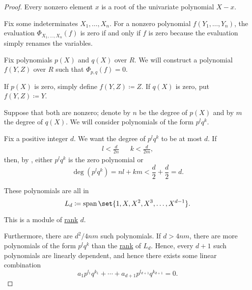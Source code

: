 \begin{proof}
   Every nonzero element \( x \) is a root of the univariate polynomial \( X - x \).

   Fix some indeterminates \( X_1, \ldots, X_n \). For a nonzero polynomial \( f(Y_1, \ldots, Y_n) \), the evaluation \( \Phi_{X_1, \dots, X_n}(f) \) is zero if and only if \( f \) is zero because the evaluation simply renames the variables.

   Fix polynomials \( p(X) \) and \( q(X) \) over \( R \). We will construct a polynomial \( f(Y, Z) \) over \( R \) such that \( \Phi_{p,q}(f) = 0 \).

  If \( p(X) \) is zero, simply define \( f(Y, Z) \coloneqq Z \). If \( q(X) \) is zero, put \( f(Y, Z) \coloneqq Y \).

  Suppose that both are nonzero; denote by \( n \) be the degree of \( p(X) \) and by \( m \) the degree of \( q(X) \). We will consider polynomials of the form \( p^l q^k \).

  Fix a positive integer \( d \). We want the degree of \( p^l q^k \) to be at most \( d \). If
  \begin{align*}
    l < \frac d {2n} && k < \frac d {2m},
  \end{align*}
  then, by , either \( p^l q^k \) is the zero polynomial or
  \begin{equation*}
    \deg(p^l q^k) = nl + km < \frac d 2 + \frac d 2 = d.
  \end{equation*}

  These polynomials are all in
  \begin{equation*}
    L_d \coloneqq \linspan\set{ 1, X, X^2, X^3, \ldots, X^{d-1} }.
  \end{equation*}

  This is a module of \hyperref[def:module_rank]{rank} \( d \).

  Furthermore, there are \( d^2 / 4nm \) such polynomials. If \( d > 4nm \), there are more polynomials of the form \( p^l q^k \) than the \hyperref[def:module_rank]{rank} of \( L_d \). Hence, every \( d + 1 \) such polynomials are linearly dependent, and hence there exists some linear combination
  \begin{equation*}
    a_1 p^{l_1} q^{k_1} + \cdots + a_{d+1} p^{l_{d+1}} q^{k_{d+1}} = 0.
  \end{equation*}


\end{proof}

